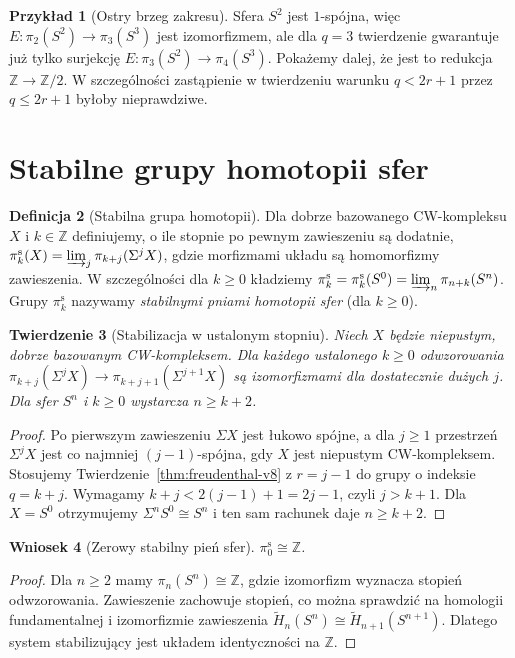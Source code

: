 \documentclass[11pt,a4paper,oneside]{report}
\newcommand{\Z}{\mathbb{Z}}
\theoremstyle{plain}
\newtheorem{twierdzenie}{Twierdzenie}[section]
\newtheorem{wniosek}[twierdzenie]{Wniosek}
\theoremstyle{definition}
\newtheorem{definicja}[twierdzenie]{Definicja}
\newtheorem{przyklad}[twierdzenie]{Przykład}
\theoremstyle{remark}
\begin{document}
\begin{przyklad}[Ostry brzeg zakresu]
Sfera $S^2$ jest $1$-spójna, więc
$E:\pi_2(S^2)\to\pi_3(S^3)$ jest izomorfizmem,
ale dla $q=3$ twierdzenie gwarantuje już tylko surjekcję
$E:\pi_3(S^2)\to\pi_4(S^3)$.
Pokażemy dalej, że jest to redukcja $\Z\to\Z/2$.
W szczególności zastąpienie w twierdzeniu
warunku $q<2r+1$ przez $q\le2r+1$
byłoby nieprawdziwe.
\end{przyklad}

\section{Stabilne grupy homotopii sfer}
\begin{definicja}[Stabilna grupa homotopii]
Dla dobrze bazowanego CW-kompleksu $X$ i $k\in\Z$
definiujemy, o ile stopnie po pewnym zawieszeniu są dodatnie,
$\pi_k^{\mathrm s}(X)=
\varinjlim_{j}\pi_{k+j}(\Sigma^jX)$,
gdzie morfizmami układu są homomorfizmy zawieszenia.
W szczególności dla $k\ge0$ kładziemy
$\pi_k^{\mathrm s}=\pi_k^{\mathrm s}(S^0)
=\varinjlim_{n}\pi_{n+k}(S^n)$.
Grupy $\pi_k^{\mathrm s}$ nazywamy \emph{stabilnymi
pniami homotopii sfer} (dla $k\ge0$).
\end{definicja}

\begin{twierdzenie}[Stabilizacja w ustalonym stopniu]
\label{thm:stable-range-v8}
Niech $X$ będzie niepustym, dobrze bazowanym
CW-kompleksem. Dla każdego ustalonego $k\ge0$
odwzorowania
$\pi_{k+j}(\Sigma^j X)\to
\pi_{k+j+1}(\Sigma^{j+1}X)$
są izomorfizmami dla dostatecznie dużych $j$.
Dla sfer $S^n$ i $k\ge0$ wystarcza $n\ge k+2$.
\end{twierdzenie}
\begin{proof}
Po pierwszym zawieszeniu $\Sigma X$ jest łukowo spójne,
a dla $j\ge1$ przestrzeń $\Sigma^jX$ jest co najmniej
$(j-1)$-spójna, gdy $X$ jest niepustym CW-kompleksem.
Stosujemy Twierdzenie~\ref{thm:freudenthal-v8}
z $r=j-1$ do grupy o indeksie $q=k+j$.
Wymagamy $k+j<2(j-1)+1=2j-1$, czyli $j>k+1$.
Dla $X=S^0$ otrzymujemy $\Sigma^nS^0\cong S^n$
i ten sam rachunek daje $n\ge k+2$.
\end{proof}

\begin{wniosek}[Zerowy stabilny pień sfer]
$\pi_0^{\mathrm s}\cong\Z$.
\end{wniosek}
\begin{proof}
Dla $n\ge2$ mamy $\pi_n(S^n)\cong\Z$,
gdzie izomorfizm wyznacza stopień odwzorowania.
Zawieszenie zachowuje stopień, co można sprawdzić
na homologii fundamentalnej i izomorfizmie zawieszenia
$\widetilde H_n(S^n)\cong\widetilde H_{n+1}(S^{n+1})$.
Dlatego system stabilizujący jest układem identyczności
na $\Z$.
\end{proof}
\end{document}
